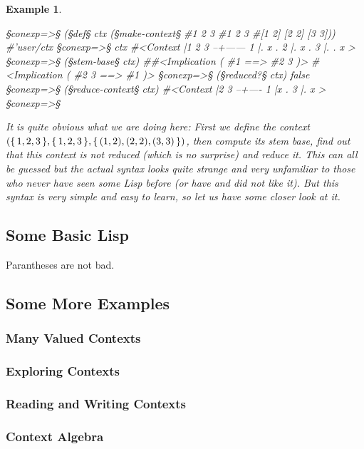 \documentclass{scrbook}
\newcommand{\set}[1]{\{\,#1\,\}}
\newcommand{\s}{\color{blue}}
\newcommand{\p}{\color{lightblue}}
\theoremstyle{plain}
\theoremstyle{plain}
\newtheorem{Example}     [Theorem] {Example}
\theoremstyle{plain}
\theoremstyle{nonumberplain}
\begin{document}
\begin{Example}~
  \begin{conexp}
    §\p conexp=>§ (§\s def§ ctx (§\s make-context§ #{1 2 3} #{1 2 3} #{[1 2] [2 2] [3 3]}))
    #'user/ctx
    §\p conexp=>§ ctx
    #<Context
      |1 2 3
    --+------
    1 |. x .
    2 |. x .
    3 |. . x
    >
    §\p conexp=>§ (§\s stem-base§ ctx)
    #{#<Implication ( #{1}  ==>  #{2 3} )> #<Implication ( #{2 3}  ==>  #{1} )>}
    §\p conexp=>§ (§\s reduced?§ ctx)
    false
    §\p conexp=>§ (§\s reduce-context§ ctx)
    #<Context
      |2 3
    --+----
    1 |x .
    3 |. x
    >
    §\p conexp=>§
  \end{conexp}

  It is quite obvious what we are doing here: First we define the context
  $(\set{1,2,3},\set{1,2,3},\break\set{(1,2),(2,2),(3,3)})$, then compute its stem base, find out that
  this context is not reduced (which is no surprise) and reduce it. This can all be guessed but the
  actual syntax looks quite strange and very unfamiliar to those who never have seen some Lisp before
  (or have and did not like it). But this syntax is very simple and easy to learn, so let us have some
  closer look at it.
\end{Example}

\subsection{Some Basic Lisp}
Parantheses are not bad.

\subsection{Some More Examples}

\subsubsection{Many Valued Contexts}

\subsubsection{Exploring Contexts}

\subsubsection{Reading and Writing Contexts}

\subsubsection{Context Algebra}
\end{document}
